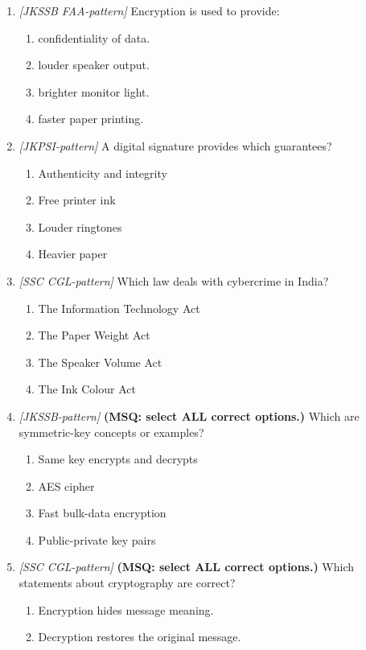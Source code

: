 \begin{enumerate}[label=\textbf{Q\arabic*.}, leftmargin=*]
\item \textit{[JKSSB FAA-pattern]} Encryption is used to provide:
  \begin{enumerate}[label=\Alph*.]
    \item confidentiality of data.
    \item louder speaker output.
    \item brighter monitor light.
    \item faster paper printing.
  \end{enumerate}
\item \textit{[JKPSI-pattern]} A digital signature provides which guarantees?
  \begin{enumerate}[label=\Alph*.]
    \item Authenticity and integrity
    \item Free printer ink
    \item Louder ringtones
    \item Heavier paper
  \end{enumerate}
\item \textit{[SSC CGL-pattern]} Which law deals with cybercrime in India?
  \begin{enumerate}[label=\Alph*.]
    \item The Information Technology Act
    \item The Paper Weight Act
    \item The Speaker Volume Act
    \item The Ink Colour Act
  \end{enumerate}
\item \textit{[JKSSB-pattern]} \textbf{(MSQ: select ALL correct options.)} Which are symmetric-key concepts or examples?
  \begin{enumerate}[label=\Alph*.]
    \item Same key encrypts and decrypts
    \item AES cipher
    \item Fast bulk-data encryption
    \item Public-private key pairs
  \end{enumerate}
\item \textit{[SSC CGL-pattern]} \textbf{(MSQ: select ALL correct options.)} Which statements about cryptography are correct?
  \begin{enumerate}[label=\Alph*.]
    \item Encryption hides message meaning.
    \item Decryption restores the original message.

\end{enumerate}
\end{enumerate}

